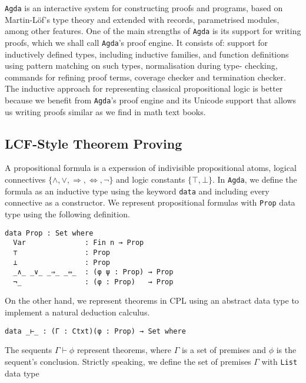 \documentclass[../main.tex]{subfiles}
\begin{document}
\verb!Agda! is an interactive system for constructing proofs and programs,
based on Martin-L\"{o}f's type theory and extended with records, parametrised
modules, among other features.
One of the main strengths of \verb!Agda! is its support for writing proofs,
which we shall call \verb!Agda!'s proof engine. It consists of: support for
inductively defined types, including inductive families, and function
definitions using pattern matching on such types, normalisation during type-
checking, commands for refining proof terms, coverage checker and termination
checker.
The inductive approach for representing classical propositional logic
is better because we benefit from \verb!Agda!'s proof engine and its Unicode
support that allows us writing proofs similar as we find in math text books.


\subsection{LCF-Style Theorem Proving}
\label{ssec:lcf-style-theormem-proving}

A propositional formula is a experssion of indivisible propositional atoms,
logical connectives $\{\wedge, \vee, \Rightarrow, \Leftrightarrow, \neg\}$
and logic constants $\{\top, \bot\}$.
In \verb!Agda!, we define the formula
as an inductive type using the keyword \texttt{data} and including every
connective as a constructor. We represent propositional formulas with
\verb!Prop! data type using the following definition.


\begin{verbatim}
data Prop : Set where
  Var              : Fin n → Prop
  ⊤                : Prop
  ⊥                : Prop
  _∧_ _∨_ _⇒_ _⇔_  : (φ ψ : Prop) → Prop
  ¬_               : (φ : Prop)   → Prop
\end{verbatim}

On the other hand, we represent theorems in CPL using an abstract data type
to implement a natural deduction calculus.

\begin{verbatim}
data _⊢_ : (Γ : Ctxt)(φ : Prop) → Set where
\end{verbatim}

The sequents  $\Gamma \vdash \phi$ represent theorems,
where $\Gamma$ is a set of premises and $\phi$ is the
sequent's conclusion. Strictly speaking, we define the set of premises
$\Gamma$ with \verb!List! data type
\end{document}
